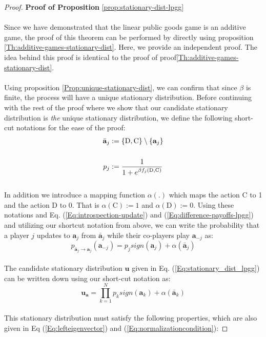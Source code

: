 \documentclass[11pt]{article}
\theoremstyle{plainCl1}
\theoremstyle{plainCl2}
\newcommand{\abf}{\mathbf{a}}
\newcommand{\ubf}{\mathbf{u}}
\newcommand{\C}{\mathrm{C}}
\newcommand{\D}{\mathrm{D}}
\begin{document}
\begin{proof}
\textbf{Proof of Proposition} \ref{prop:stationary-dist-lpgg} \\ \\
Since we have demonstrated that the linear public goods game is an additive game, the proof of this theorem can be performed by directly using proposition \ref{Th:additive-games-stationary-dist}. Here, we provide an independent proof. The idea behind this proof is identical to the proof of proof\ref{Th:additive-games-stationary-dist}. \\ \\
\noindent Using proposition \ref{Prop:unique-stationary-dist}, we can confirm that since $\beta$ is finite, the process will have a unique stationary distribution. Before continuing with the rest of the proof where we show that our candidate stationary distribution is \emph{the} unique stationary distribution, we define the following short-cut notations for the ease of the proof: 
\begin{align}
\bar{\abf}_j &:= \{\D,\C\} \setminus \{\abf_j\}  \\ \notag \\ 
p_j &:= \frac{1}{1 + \displaystyle e^{\beta f_j(\D, \C)}} 
\end{align} \\
In addition we introduce a mapping function $\alpha(.)$ which maps the action $\C$ to 1 and the action $\D$ to 0. That is $\alpha(\C) := 1$ and $\alpha(\D) := 0$. Using these notations and Eq. (\ref{Eq:introspection-update}) and (\ref{Eq:difference-payoffs-lpgg}) and utilizing our shortcut notation from above, we can write the probability that a player $j$ updates to $\abf_j$ from $\bar{\abf}_j$ while their co-players play $\abf_{-j}$ as: \\
\begin{equation}
p_{\displaystyle \bar{\abf}_j  \to \abf_j} (\abf_{-j}) = p_j \mathit{sign}(\abf_j) + \alpha(\bar{\abf}_j) 
\end{equation}\\
The candidate stationary distribution $\ubf$ given in Eq. (\ref{Eq:stationary_dist_lpgg}) can be written down using our short-cut notation as: \\
\begin{equation}
\label{Eq:stationary-dist-shortcut}
\ubf_\abf = \prod_{k = 1}^{N}  p_k \mathit{sign}(\abf_k) + \alpha(\bar{\abf}_k)
\end{equation}\\
This stationary distribution must satisfy the following properties, which are also given in Eq  (\ref{Eq:lefteigenvector}) and (\ref{Eq:normalizationcondition}):

\end{proof}
\end{document}

